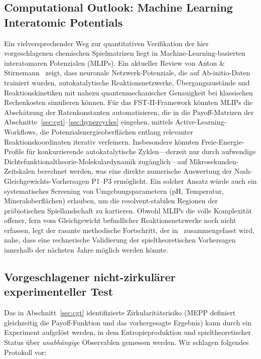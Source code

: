 \documentclass[12pt,a4paper]{article}
\theoremstyle{remark}
\begin{document}
\subsection{Computational Outlook: Machine Learning Interatomic Potentials}

Ein vielversprechender Weg zur quantitativen Verifikation der hier vorgeschlagenen chemischen Spielmatrizen liegt in Machine-Learning-basierten interatomaren Potenzialen (MLIPs). Ein aktueller Review von Anton \& Stirnemann~\citep{AntonStirnemann2026} zeigt, dass neuronale Netzwerk-Potenziale, die auf Ab-initio-Daten trainiert wurden, autokatalytische Reaktionsnetzwerke, \"Ubergangszust\"ande und Reaktionskinetiken mit nahezu quantenmechanischer Genauigkeit bei klassischen Rechenkosten simulieren k\"onnen. F\"ur das FST-II-Framework k\"onnten MLIPs die Absch\"atzung der Ratenkonstanten automatisieren, die in die Payoff-Matrizen der Abschnitte~\ref{sec:cgt}--\ref{sec:hypercycles} eingehen, mittels Active-Learning-Workflows, die Potenzialenergieoberfl\"achen entlang relevanter Reaktionskoordinaten iterativ verfeinern. Insbesondere k\"onnten Freie-Energie-Profile f\"ur konkurrierende autokatalytische Zyklen---derzeit nur durch aufwendige Dichtefunktionaltheorie-Molekulardynamik zug\"anglich---auf Mikrosekunden-Zeitskalen berechnet werden, was eine direkte numerische Auswertung der Nash-Gleichgewichts-Vorhersagen P1--P3 erm\"oglicht. Ein solcher Ansatz w\"urde auch ein systematisches Screening von Umgebungsparametern (pH, Temperatur, Mineraloberfl\"achen) erlauben, um die resolvent-stabilen Regionen der pr\"abiotischen Spiellandschaft zu kartieren. Obwohl MLIPs die volle Komplexit\"at offener, fern vom Gleichgewicht befindlicher Reaktionsnetzwerke noch nicht erfassen, legt der rasante methodische Fortschritt, der in~\citep{AntonStirnemann2026} zusammengefasst wird, nahe, dass eine rechnerische Validierung der spieltheoretischen Vorhersagen innerhalb der n\"achsten Jahre m\"oglich werden k\"onnte.

\subsection{Vorgeschlagener nicht-zirkul\"arer experimenteller Test}
\label{sec:noncircular-test}

Das in Abschnitt~\ref{sec:cgt} identifizierte Zirkularit\"atsrisiko (MEPP definiert gleichzeitig die Payoff-Funktion und das vorhergesagte Ergebnis) kann durch ein Experiment aufgel\"ost werden, in dem Entropieproduktion und spieltheoretischer Status \"uber \emph{unabh\"angige} Observablen gemessen werden. Wir schlagen folgendes Protokoll vor:
\end{document}
